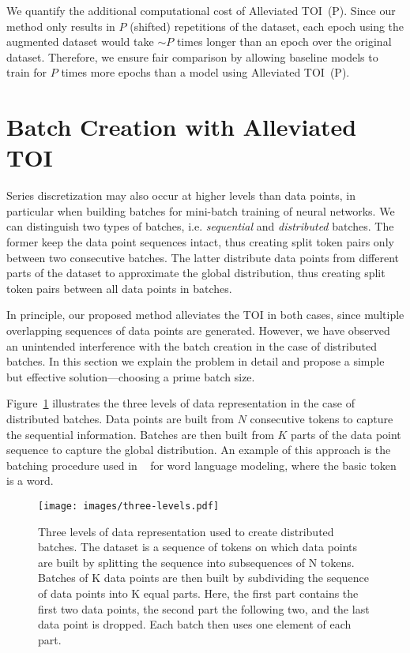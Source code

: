 \documentclass[11pt,a4paper]{article}
\begin{document}
We quantify the additional computational cost of Alleviated TOI~(P). Since our method only results in $P$ (shifted) repetitions of the dataset, each epoch using the augmented dataset would take $\sim P$ times longer than an epoch over the original dataset. Therefore, we ensure fair comparison by allowing baseline models to train for $P$ times more epochs than a model using Alleviated TOI~(P).

\section{Batch Creation with Alleviated TOI}
\label{section: prime}

Series discretization may also occur at higher levels than data points, in particular when building batches for mini-batch training of neural networks. We can distinguish two types of batches, i.e. \textit{sequential} and \textit{distributed} batches. The former keep the data point sequences intact, thus creating split token pairs only between two consecutive batches. The latter distribute data points from different parts of the dataset to approximate the global distribution, thus creating split token pairs between all data points in batches.

In principle, our proposed method alleviates the TOI in both cases, since multiple overlapping sequences of data points are generated. However, we have observed an unintended interference with the batch creation in the case of distributed batches. In this section we explain the problem in detail and propose a simple but effective solution---choosing a prime batch size.

Figure~\ref{fig:three levels} illustrates the three levels of data representation in the case of distributed batches. Data points are built from $N$ consecutive tokens to capture the sequential information. Batches are then built from $K$ parts of the data point sequence to capture the global distribution. An example of this approach is the batching procedure used in ~\citet{zoph2016:neural,Merity:17,Zhilin:17,zolna2017:fraternal} for word language modeling, where the basic token is a word.


\begin{figure}
    \centering
    \texttt{[image: images/three-levels.pdf]}
    \caption{Three levels of data representation used to create distributed batches. The dataset is a sequence of tokens on which data points are built by splitting the sequence into subsequences of N tokens. Batches of K data points are then built by subdividing the sequence of data points into K equal parts. Here, the first part contains the first two data points, the second part the following two, and the last data point is dropped. Each batch then uses one element of each part.}
    \label{fig:three levels}
\end{figure}
\end{document}
